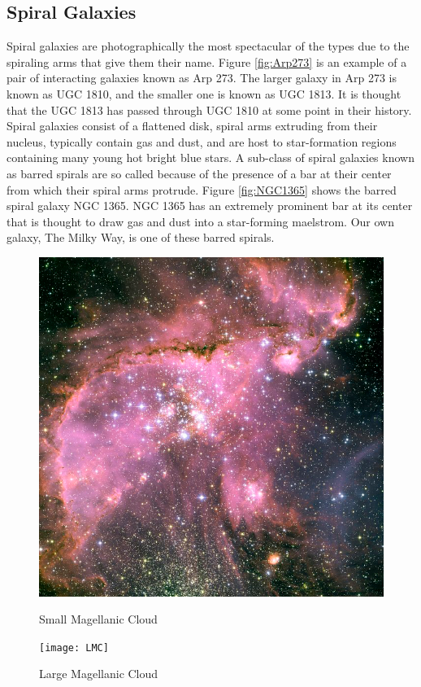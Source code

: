 \documentclass[12pt, oneside]{smuthesis}
\begin{document}
\subsection{\sc Spiral Galaxies} \label{spiralGalaxies}

Spiral galaxies are photographically the most spectacular of the types due to the spiraling arms that give them their name. Figure \ref{fig:Arp273} is an example of a pair of interacting galaxies known as Arp 273. The larger galaxy in Arp 273 is known as UGC 1810, and the smaller one is known as UGC 1813. It is thought that the UGC 1813 has passed through UGC 1810 at some point in their history. Spiral galaxies consist of a flattened disk, spiral arms extruding from their nucleus, typically contain gas and dust, and are host to star-formation regions containing many young hot bright blue stars. A sub-class of spiral galaxies known as barred spirals are so called because of the presence of a bar at their center from which their spiral arms protrude. Figure \ref{fig:NGC1365} shows the barred spiral galaxy NGC 1365. NGC 1365 has an extremely prominent bar at its center that is thought to draw gas and dust into a star-forming maelstrom. Our own galaxy, The Milky Way, is one of these barred spirals.

\begin{figure}[H]
	\centering
	\begin{minipage}{0.48\textwidth}
		\centering
		\includegraphics[width=0.9\linewidth]{SMC}
		\caption{Small Magellanic Cloud \citep{smallmag}}
		\label{fig:SMC}
	\end{minipage}
	\begin{minipage}{0.04\textwidth}
		\centering
	\end{minipage}
	\begin{minipage}{0.48\textwidth}
		\centering
		\texttt{[image: LMC]}
		\caption{Large Magellanic Cloud \citep{largemag}}
		\label{fig:LMC}
	\end{minipage}
\end{figure}
\end{document}
